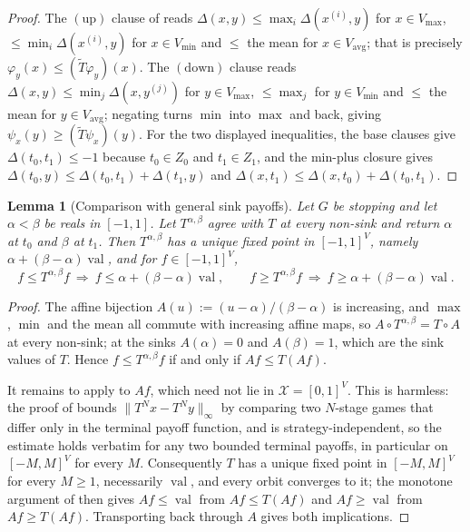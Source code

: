 \documentclass[11pt]{article}
\theoremstyle{plain}
\newtheorem{lemma}[theorem]{Lemma}
\theoremstyle{definition}
\DeclareMathOperator{\val}{val}
\newcommand{\Vmax}{V_{\max}}
\newcommand{\Vmin}{V_{\min}}
\newcommand{\Vavg}{V_{\mathrm{avg}}}
\begin{document}
\begin{proof}
The $(\mathrm{up})$ clause of  reads
$\Delta(x,y)\le\max_i\Delta(x^{(i)},y)$ for $x\in\Vmax$,
$\le\min_i\Delta(x^{(i)},y)$ for $x\in\Vmin$ and $\le$ the mean for
$x\in\Vavg$; that is precisely
$\varphi_y(x)\le(\widetilde T\varphi_y)(x)$. The $(\mathrm{down})$ clause
reads $\Delta(x,y)\le\min_j\Delta(x,y^{(j)})$ for $y\in\Vmax$,
$\le\max_j$ for $y\in\Vmin$ and $\le$ the mean for $y\in\Vavg$; negating
turns $\min$ into $\max$ and back, giving
$\psi_x(y)\ge(\widetilde T\psi_x)(y)$. For the two displayed
inequalities, the base clauses give $\Delta(t_0,t_1)\le-1$ because
$t_0\in Z_0$ and $t_1\in Z_1$, and the min-plus closure gives
$\Delta(t_0,y)\le\Delta(t_0,t_1)+\Delta(t_1,y)$ and
$\Delta(x,t_1)\le\Delta(x,t_0)+\Delta(t_0,t_1)$.
\end{proof}

\begin{lemma}[Comparison with general sink payoffs]\label{lem:gen-comparison}
Let $G$ be stopping and let $\alpha<\beta$ be reals in $[-1,1]$. Let
$T^{\alpha,\beta}$ agree with $T$ at every non-sink and return $\alpha$
at $t_0$ and $\beta$ at $t_1$. Then $T^{\alpha,\beta}$ has a unique fixed
point in $[-1,1]^{V}$, namely $\alpha+(\beta-\alpha)\val$, and for
$f\in[-1,1]^{V}$,
\[
  f\le T^{\alpha,\beta}f\ \Longrightarrow\ f\le\alpha+(\beta-\alpha)\val,
  \qquad
  f\ge T^{\alpha,\beta}f\ \Longrightarrow\ f\ge\alpha+(\beta-\alpha)\val .
\]
\end{lemma}

\begin{proof}
The affine bijection $A(u):=(u-\alpha)/(\beta-\alpha)$ is increasing, and
$\max$, $\min$ and the mean all commute with increasing affine maps, so
$A\circ T^{\alpha,\beta}=T\circ A$ at every non-sink; at the sinks
$A(\alpha)=0$ and $A(\beta)=1$, which are the sink values of $T$. Hence
$f\le T^{\alpha,\beta}f$ if and only if $Af\le T(Af)$.

It remains to apply  to $Af$, which need not lie in
$\mathcal X=[0,1]^{V}$. This is harmless: the proof of
 bounds $\lVert T^{N}x-T^{N}y\rVert_\infty$ by
comparing two $N$-stage games that differ only in the terminal payoff
function, and  is strategy-independent, so the
estimate holds verbatim for any two bounded terminal payoffs, in
particular on $[-M,M]^{V}$ for every $M$. Consequently $T$ has a unique
fixed point in $[-M,M]^{V}$ for every $M\ge1$, necessarily $\val$, and
every orbit converges to it; the monotone argument of
 then gives $Af\le\val$ from $Af\le T(Af)$ and
$Af\ge\val$ from $Af\ge T(Af)$. Transporting back through $A$ gives both
implications.
\end{proof}
\end{document}
